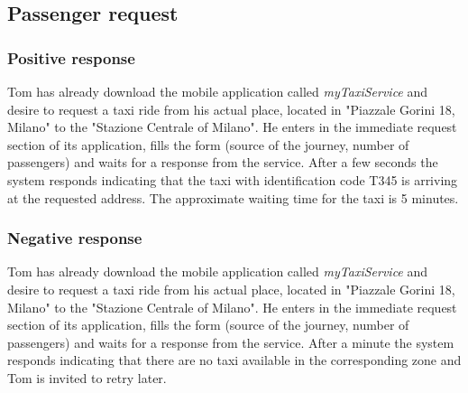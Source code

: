 \subsection{Passenger request}
\subsubsection{Positive response}
Tom has already download the mobile application called \textit{myTaxiService} and desire to request a taxi ride from his actual place, located in "Piazzale Gorini 18, Milano" to the "Stazione Centrale of Milano". He enters in the immediate request section of its application, fills the form (source of the journey, number of passengers) and waits for a response from the service.
After a few seconds the system responds indicating that the taxi with identification code T345 is arriving at the requested address. The approximate waiting time for the taxi is 5 minutes.

\subsubsection{Negative response}
Tom has already download the mobile application called \textit{myTaxiService} and desire to request a taxi ride from his actual place, located in "Piazzale Gorini 18, Milano" to the "Stazione Centrale of Milano". He enters in the immediate request section of its application, fills the form (source of the journey, number of passengers) and waits for a response from the service.
After a minute the system responds indicating that there are no taxi available in the corresponding zone and Tom is invited to retry later.

